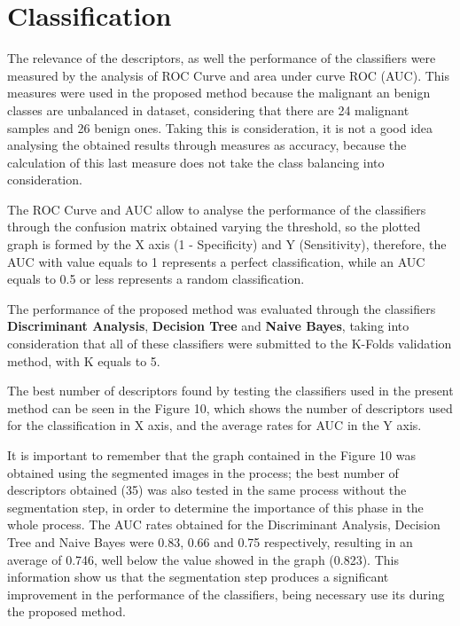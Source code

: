 \documentclass[conference]{IEEEtran}
\begin{document}
\section{Classification}
The relevance of the descriptors, as well the performance of the classifiers were measured by the analysis of ROC Curve and area under curve ROC (AUC). This measures were used in the proposed method because the malignant an benign classes are unbalanced in dataset, considering that there are 24 malignant samples and 26 benign ones. Taking this is consideration, it is not a good idea analysing the obtained results through measures as accuracy, because the calculation of this last measure does not take the class balancing into consideration.\par
The ROC Curve and AUC allow to analyse the performance of the classifiers through the confusion matrix obtained varying the threshold, so the plotted graph is formed by the X axis (1 - Specificity) and Y (Sensitivity), therefore, the AUC with value equals to 1 represents a perfect classification, while an AUC equals to 0.5 or less represents a random classification.\par
The performance of the proposed method was evaluated through the classifiers \textbf{Discriminant Analysis}, \textbf{Decision Tree} and \textbf{Naive Bayes}, taking into consideration that all of these classifiers were submitted to the K-Folds validation method, with K equals to 5.\par
The best number of descriptors found by testing the classifiers used in the present method can be seen in the Figure 10, which shows the number of descriptors used for the classification in X axis, and the average rates for AUC in the Y axis.\par
It is important to remember that the graph contained in the Figure 10 was obtained using the segmented images in the process; the best number of descriptors obtained (35) was also tested in the same process without the segmentation step, in order to determine the importance of this phase in the whole process. The AUC rates obtained for the Discriminant Analysis, Decision Tree and Naive Bayes were 0.83, 0.66 and 0.75 respectively, resulting in an average of 0.746, well below the value showed in the graph (0.823). This information show us that the segmentation step produces a significant improvement in the performance of the classifiers, being necessary use its during the proposed method.
\end{document}
